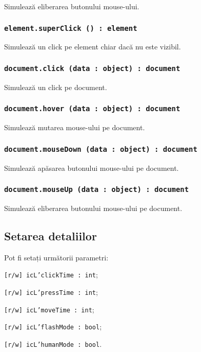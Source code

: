 Simulează eliberarea butonului mouse-ului.

\subsubsection{\texttt{element.superClick () : element}}

Simulează un click pe element chiar dacă nu este vizibil.

\subsubsection{\texttt{document.click (data : object) : document}}

Simulează un click pe document.

\subsubsection{\texttt{document.hover (data : object) : document}}

Simulează mutarea mouse-ului pe document.

\subsubsection{\texttt{document.mouseDown (data : object) : document}}

Simulează apăsarea butonului mouse-ului pe document.

\subsubsection{\texttt{document.mouseUp (data : object) : document}}

Simulează eliberarea butonului mouse-ului pe document.

\subsection{Setarea detaliilor}

Pot fi setați următorii parametri:
\begin{icItems}
	\item \texttt{[r/w] icL'clickTime : int};
	\item \texttt{[r/w] icL'pressTime : int};
	\item \texttt{[r/w] icL'moveTime : int};
	\item \texttt{[r/w] icL'flashMode : bool};
	\item \texttt{[r/w] icL'humanMode : bool}.
\end{icItems}

